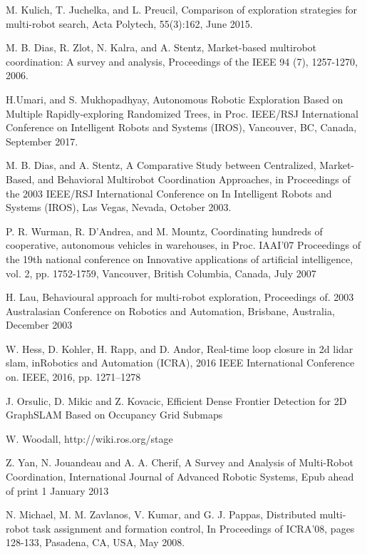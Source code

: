 \documentclass[letterpaper, 10 pt, conference]{ieeeconf}  %
\begin{document}
\begin{thebibliography}{99}
 M. Kulich, T. Juchelka, and L. Preucil, Comparison of exploration strategies for multi-robot search, Acta Polytech, 55(3):162, June 2015. 

 M. B. Dias, R. Zlot, N. Kalra, and A. Stentz, Market-based multirobot coordination: A survey and analysis, Proceedings of the IEEE 94 (7), 1257-1270, 2006.

 H.Umari, and S. Mukhopadhyay, Autonomous Robotic Exploration Based on Multiple Rapidly-exploring Randomized Trees,  in Proc. IEEE/RSJ International Conference on Intelligent Robots and Systems (IROS), Vancouver, BC, Canada, September 2017.

 M. B. Dias, and A. Stentz, A Comparative Study between Centralized, Market-Based, and Behavioral Multirobot Coordination Approaches, in Proceedings of the 2003 IEEE/RSJ  International Conference on In Intelligent Robots and Systems (IROS), Las Vegas, Nevada, October 2003.

 P. R. Wurman, R. D'Andrea, and M. Mountz, Coordinating hundreds of cooperative, autonomous vehicles in warehouses, in Proc. IAAI'07 Proceedings of the 19th national conference on Innovative applications of artificial intelligence, vol. 2, pp. 1752-1759, Vancouver, British Columbia, Canada, July 2007
 
 H. Lau, Behavioural approach for multi-robot exploration, Proceedings of. 2003 Australasian Conference on Robotics and Automation, Brisbane, Australia, December 2003

 W.  Hess,  D.  Kohler,  H.  Rapp,  and  D.  Andor, Real-time  loop  closure in  2d  lidar  slam, inRobotics  and  Automation  (ICRA), 2016  IEEE International Conference on. IEEE, 2016, pp. 1271–1278

 J. Orsulic, D. Mikic and Z. Kovacic, Efficient Dense Frontier Detection for 2D GraphSLAM Based on Occupancy Grid Submaps

 W. Woodall, http://wiki.ros.org/stage

Z. Yan, N. Jouandeau and A. A. Cherif, A Survey and Analysis of Multi-Robot Coordination, International Journal of Advanced Robotic Systems, Epub ahead of print 1 January 2013

 N. Michael, M. M. Zavlanos, V. Kumar, and G. J. Pappas, Distributed multi-robot task assignment and formation control, In Proceedings of ICRA'08, pages 128-133, Pasadena, CA, USA, May 2008.

\end{thebibliography}
\end{document}
